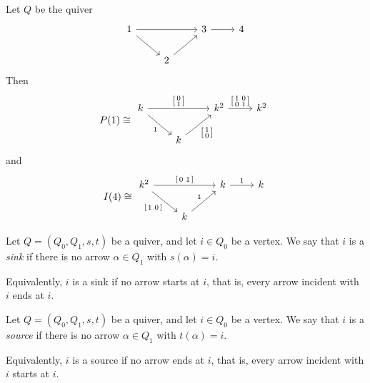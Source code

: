 \documentclass[11pt, a4paper]{report}
\begin{document}
\begin{example}
    Let $Q$ be the quiver
    \[
        \begin{tikzcd}
            1 \arrow[rd] \arrow[rr] &              & 3 \arrow[r] & 4 \\
            & 2 \arrow[ru] &             &
        \end{tikzcd}
    \]
    Then
    \[
        P(1)\cong
        \begin{tikzcd}[ampersand replacement=\&]
            k \arrow[rd, "1"']
            \arrow[rr, "{\left[\begin{smallmatrix}0\\1\end{smallmatrix}\right]}"] \&
            \& k^2 \arrow[r, "{\left[\begin{smallmatrix}1&0\\0&1\end{smallmatrix}\right]}"] \& k^2 \\
            \& k \arrow[ru, "{\left[\begin{smallmatrix}1\\0\end{smallmatrix}\right]}"'] \& \&
        \end{tikzcd}
    \]
    and
    \[
        I(4)\cong
        \begin{tikzcd}[ampersand replacement=\&]
            k^2 \arrow[rd, "{\left[\begin{smallmatrix}1&0\end{smallmatrix}\right]}"'] \arrow[rr, "{\left[\begin{smallmatrix}0&1\end{smallmatrix}\right]}"] \&                   \& k \arrow[r, "1"] \& k \\
            \& k \arrow[ru, "1"] \&                  \&
        \end{tikzcd}
    \]
\end{example}

\begin{definition}
    Let $Q=(Q_0,Q_1,s,t)$ be a quiver, and let $i\in Q_0$ be a vertex. We say that $i$
    is a \emph{sink} if there is no arrow $\alpha\in Q_1$ with $s(\alpha)=i$.

    Equivalently, $i$ is a sink if no arrow starts at $i$, that is, every arrow incident
    with $i$ ends at $i$.
\end{definition}

\begin{definition}
    Let $Q=(Q_0,Q_1,s,t)$ be a quiver, and let $i\in Q_0$ be a vertex. We say that $i$
    is a \emph{source} if there is no arrow $\alpha\in Q_1$ with $t(\alpha)=i$.

    Equivalently, $i$ is a source if no arrow ends at $i$, that is, every arrow incident
    with $i$ starts at $i$.
\end{definition}
\end{document}
